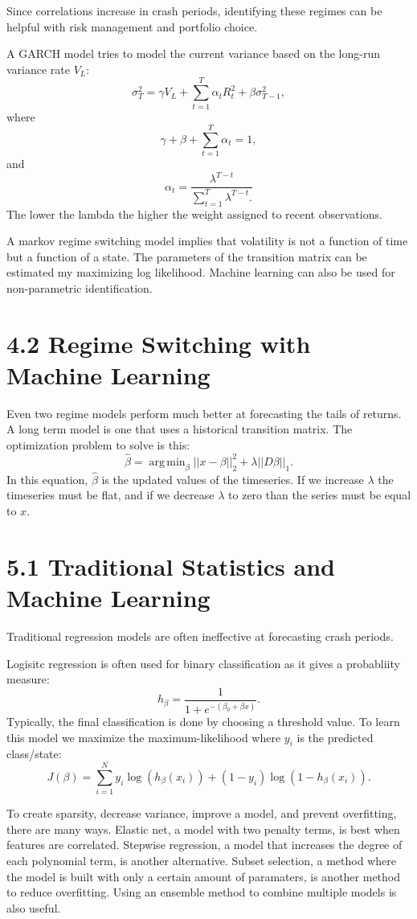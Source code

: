 \documentclass{article}
\DeclareMathOperator*{\argmin}{arg\,min}
\begin{document}
Since correlations increase in crash periods,
identifying these regimes can be helpful with
risk management and portfolio choice.

A GARCH model tries to model the current variance
based on the long-run variance rate $V_L$:
\[
\sigma_T^2 = \gamma V_L + 
\sum_{t=1}^T \alpha_t R_t^2 + \beta \sigma_{T-1}^2,
\]
where
\[ \gamma + \beta + \sum_{t=1}^T \alpha_t = 1,\]
and \[ \alpha_t = \frac{\lambda^{T-t}}{\sum_{t=1}^T \lambda^{T-t}.}\]
The lower the lambda the higher the weight assigned to recent
observations. 

A markov regime switching model implies that volatility is
not a function of time but a function of a state. 
The parameters of the transition matrix can be estimated 
my maximizing log likelihood. Machine learning can also be used
for non-parametric identification.

\section*{4.2 Regime Switching with Machine Learning}

Even two regime models perform much better at forecasting
the tails of returns. A long term model is one that uses
a historical transition matrix. The optimization problem to solve
is this:
\[
\hat{\beta} = \argmin_\beta  || x-\beta||_2^2 + \lambda||D\beta||_1. 
\]
In this equation, $\hat{\beta}$ is the updated values of the timeseries.
If we increase $\lambda$ the timeseries must be flat, and if we 
decrease $\lambda$ to zero than the series must be equal to $x$. 

\section*{5.1 Traditional Statistics and Machine Learning}

Traditional regression models are often ineffective
at forecasting crash periods. 


Logisitc regression is often used for binary classification as 
it gives a probabliity measure: 
\[
h_\beta = \frac{1}{1+e^{-(\beta_0 + \beta x)}}.
\]
Typically, the final classification is done by choosing 
a threshold value. To learn this model we maximize
the maximum-likelihood where $y_i$ is the predicted class/state:
\[
J(\beta) = \sum_{i=1}^N y_i\log(h_\beta(x_i)) + (1-y_i)\log(1-h_\beta(x_i)).
\]

To create sparsity, decrease variance, improve a model, 
and prevent overfitting, there are many ways. 
Elastic net, a model with two penalty terms, is best when features
are correlated. Stepwise regression, a model that increases the degree of each
polynomial term, is another alternative. Subset selection,
a method where the model is built with only a certain amount of 
paramaters, is another method to reduce overfitting. Using an ensemble method
to combine multiple models is also useful. 
\end{document}
